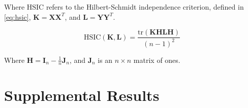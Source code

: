 \documentclass[conference,compsoc]{IEEEtran}
\begin{document}
\noindent
Where \(\text{HSIC}\) refers to the Hilbert-Schmidt independence criterion, defined in \ref{eq:hsic}, \(\mathbf{K} = \mathbf{X}\mathbf{X}^T\), and \(\mathbf{L} = \mathbf{Y}\mathbf{Y}^T\). 

\begin{equation}
    \text{HSIC}\left(\mathbf{K}, \mathbf{L}\right) = \frac{\text{tr}\left(\mathbf{KHLH}\right)}{\left(n - 1\right)^2}\label{eq:hsic}
\end{equation}

\noindent
Where \(\mathbf{H} = \mathbf{I}_n - \frac{1}{n}\mathbf{J}_n\), and \(\mathbf{J}_n\) is an \(n \times n\) matrix of ones. 





\section{Supplemental Results}
\end{document}
